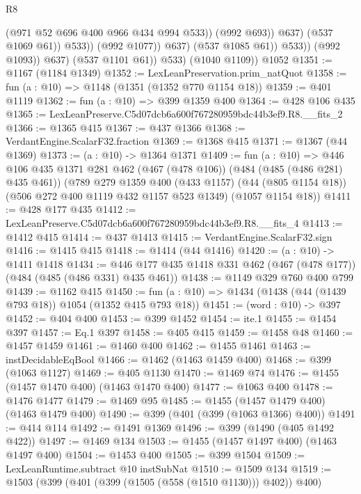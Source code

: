\begin{lexlean}{R8}
\begin{coremodule}
                                    (@971 @52 @696 @400 @966 @434 @994 @533))
                                  (@992 @693))
                                @637)
                              (@537 @1069 @61))
                            @533))
                        (@992 @1077))
                      @637)
                    (@537 @1085 @61))
                  @533))
              (@992 @1093))
            @637)
          (@537 @1101 @61))
        @533)
      (@1040 @1109))
    @1052
@1351 := @1167 (@1184 @1349)
@1352 := LexLeanPreservation.prim_natQuot
@1358 := fun (a : @10) => @1148 (@1351 (@1352 @770 @1154 @18))
@1359 := @401 @1119
@1362 := fun (a : @10) => @399 @1359 @400
@1364 := @428 @106 @435
@1365 := LexLeanPreserve.C5d07dcb6a600f767280959bdc44b3ef9.R8.__fits_2
@1366 := @1365 @415
@1367 := @437 @1366
@1368 := VerdantEngine.ScalarF32.fraction
@1369 := @1368 @415
@1371 := @1367 (@44 @1369)
@1373 := (a : @10) -> @1364 @1371
@1409 := fun (a : @10) =>
  @446
    @106
    @435
    @1371
    @281
    @462
    (@467 (@478 @106))
    (@484 (@485 (@486 @281) @435 @461))
    (@789
      @279
      @1359
      @400
      (@433 @1157)
      (@44 (@805 @1154 @18))
      (@506 @272 @400 @1119 @432 @1157 @523 @1349)
      (@1057 @1154 @18))
@1411 := @428 @177 @435
@1412 := LexLeanPreserve.C5d07dcb6a600f767280959bdc44b3ef9.R8.__fits_4
@1413 := @1412 @415
@1414 := @437 @1413
@1415 := VerdantEngine.ScalarF32.sign
@1416 := @1415 @415
@1418 := @1414 (@44 @1416)
@1420 := (a : @10) -> @1411 @1418
@1434 := @446 @177 @435 @1418 @331 @462 (@467 (@478 @177)) (@484 (@485 (@486 @331) @435 @461))
@1438 := @1149 @329 @760 @400 @799
@1439 := @1162 @415
@1450 := fun (a : @10) => @1434 (@1438 (@44 (@1439 @793 @18)) @1054 (@1352 @415 @793 @18))
@1451 := (word : @10) -> @397
@1452 := @404 @400
@1453 := @399 @1452
@1454 := ite.{1}
@1455 := @1454 @397
@1457 := Eq.{1} @397
@1458 := @405 @415
@1459 := @1458 @48
@1460 := @1457 @1459
@1461 := @1460 @400
@1462 := @1455 @1461
@1463 := instDecidableEqBool
@1466 := @1462 (@1463 @1459 @400)
@1468 := @399 (@1063 @1127)
@1469 := @405 @1130
@1470 := @1469 @74
@1476 := @1455 (@1457 @1470 @400) (@1463 @1470 @400)
@1477 := @1063 @400
@1478 := @1476 @1477
@1479 := @1469 @95
@1485 := @1455 (@1457 @1479 @400) (@1463 @1479 @400)
@1490 := @399 (@401 (@399 (@1063 @1366) @400))
@1491 := @414 @114
@1492 := @1491 @1369
@1496 := @399 (@1490 (@405 @1492 @422))
@1497 := @1469 @134
@1503 := @1455 (@1457 @1497 @400) (@1463 @1497 @400)
@1504 := @1453 @400
@1505 := @399 @1504
@1509 := LexLeanRuntime.subtract @10 instSubNat
@1510 := @1509 @134
@1519 := @1503 (@399 (@401 (@399 (@1505 (@558 (@1510 @1130))) @402)) @400)

\end{coremodule}
\end{lexlean}
